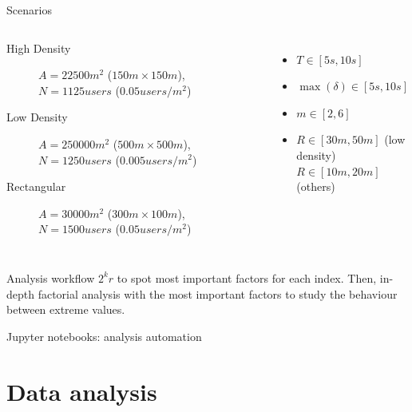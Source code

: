 \documentclass[aspectratio=169]{beamer}
\begin{document}
\begin{frame}{Scenarios}
	\begin{columns}
		\begin{description}
			\item[High Density] \(A = 22500m^2\) (\(150m \times
				150m\)), \(N = 1125\mathit{users}\) (\(0.05
					\mathit{users}/m^2\))
			\item[Low Density] \(A = 250000m^2\) (\(500m \times
				500m\)), \(N = 1250\mathit{users}\) (\(0.005
					\mathit{users}/m^2\))
			\item[Rectangular] \(A = 30000m^2\) (\(300m \times
				100m\)), \(N = 1500\mathit{users}\) (\(0.05
					\mathit{users}/m^2\))
		\end{description}
		\begin{itemize}
			\item \(T \in [5s, 10s]\)
			\item \(\max(\delta) \in [5s, 10s]\)
			\item \(m \in [2, 6]\)
			\item \(R \in [30m, 50m]\) (low density)\\
				\(R \in [10m, 20m]\) (others)
		\end{itemize}
	\end{columns}
	\begin{block}{Analysis workflow}
		\(2^{k}r\) to spot most important factors for each index. Then,
		in-depth factorial analysis with the most important factors to
		study the behaviour between extreme values.
	\end{block}
	\begin{center}
		Jupyter notebooks: analysis automation
	\end{center}
\end{frame}

\section{Data analysis}
\end{document}
